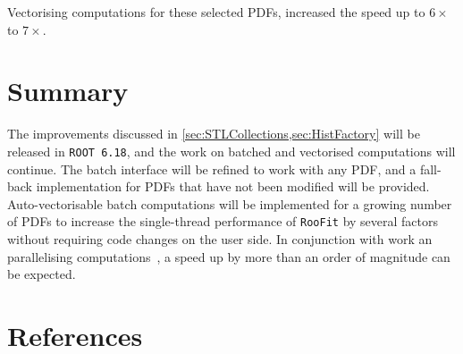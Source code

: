 \documentclass[a4paper]{jpconf}
\newcommand{\RooFit}{\texttt{RooFit}\xspace}
\newcommand{\ROOT}{\texttt{ROOT}\xspace}
\begin{document}
Vectorising computations for these selected PDFs, increased the speed up to $6{\times}$ to $7{\times}$.



\section{Summary}
The improvements discussed in \cref{sec:STLCollections,sec:HistFactory} will be released in \texttt{\ROOT 6.18},
and the work on batched and vectorised computations will continue. The batch interface will be refined to work with any PDF, and a fall-back
implementation for PDFs that have not been modified will be provided. Auto-vectorisable batch computations will be implemented for a growing number of PDFs to increase the
single-thread performance of \RooFit by several factors without requiring code changes on the user side.
In conjunction with work an parallelising computations~\cite{Patrick}, a speed up by more than an order of magnitude can be expected.


\vfill

\section*{References}

\end{document}

